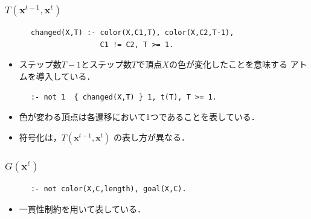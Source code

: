 \documentclass[dvipdfmx,11pt]{beamer}
\begin{document}
\begin{frame}[fragile]\frametitle{$T(\bm{x}^{t-1},\bm{x}^{t})$}

  \begin{exampleblock}{}
    \begin{lstlisting}
      changed(X,T) :- color(X,C1,T), color(X,C2,T-1),
                      C1 != C2, T >= 1.
    \end{lstlisting}
  \end{exampleblock}
  \begin{itemize}
    \item ステップ数$T-1$とステップ数$T$で頂点$X$の色が変化したことを意味する
          アトムを導入している．
  \end{itemize}

  \begin{exampleblock}{}
    \begin{lstlisting}
      :- not 1  { changed(X,T) } 1, t(T), T >= 1.
    \end{lstlisting}
  \end{exampleblock}
  \begin{itemize}
    \item 色が変わる頂点は各遷移において1つであることを表している．
  \end{itemize}
  \bigskip
  \begin{itemize}
    \item {}符号化は，$T(\bm{x}^{t-1},\bm{x}^{t})$
          の表し方が異なる．
  \end{itemize}
  
\end{frame}

\begin{frame}[fragile]\frametitle{$G(\bm{x}^\ell)$}

  \begin{exampleblock}{}
    \begin{lstlisting}
      :- not color(X,C,length), goal(X,C).
    \end{lstlisting}
  \end{exampleblock}
  \begin{itemize}
    \item 一貫性制約を用いて表している．
  \end{itemize}
  
\end{frame}
\end{document}
